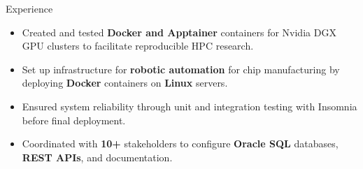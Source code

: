 \documentclass{resume} %
\begin{document}
\begin{workSection}{Experience}
	
	\experienceItem[
	company=Capital One,
	location=McLean{,} VA,
	position=Incoming Software Engineering Intern,
	duration= June 2025 - August 2025,
	]
	
	\experienceItem[
	company=UTEP,
	location=El Paso{,} TX,
	position=Undergraduate Research Assistant,
	duration= January 2025 - May 2025,
	]
	\begin{itemize}
		\vspace{-0.5em}
		\itemsep -6pt {}
		\item Created and tested \textbf{Docker and Apptainer} containers for Nvidia DGX GPU clusters to facilitate reproducible HPC research.
	\end{itemize}
	
	\experienceItem[
	company=Texas Instruments,
	location=Dallas{,} TX,
	position=Information Technology Intern,
	duration= May 2024 - August 2024,
	]
	\begin{itemize}
		\vspace{-0.5em}
		\itemsep -6pt {}
		\item Set up infrastructure for \textbf{robotic automation} for chip manufacturing by deploying \textbf{Docker} containers on \textbf{Linux} servers.
		\item Ensured system reliability through unit and integration testing with Insomnia before final deployment.
		\item Coordinated with \textbf{10+} stakeholders to configure \textbf{Oracle SQL} databases, \textbf{REST APIs}, and documentation.
	\end{itemize}
	

\end{workSection}
\end{document}
